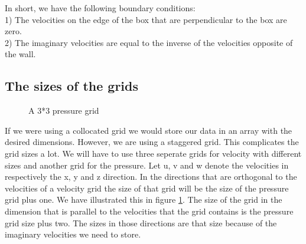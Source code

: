 \documentclass{article}
\begin{document}
In short, we have the following boundary conditions: \\
1) The velocities on the edge of the box that are perpendicular to the box are zero.\\
2) The imaginary velocities are equal to the inverse of the velocities opposite of the wall.

\newpage
\subsection{The sizes of the grids} \label{The sizes of the grids}
\begin{figure}[ht]
\centering
\caption{A 3*3 pressure grid}
\label{grid sizes}
\end{figure}

If we were using a collocated grid we would store our data in an array with the desired dimensions. However, we are using a staggered grid. This complicates the grid sizes a lot. We will have to use three seperate grids for velocity with different sizes and another grid for the pressure. Let u, v and w denote the velocities in respectively the x, y and z direction.  In the directions that are orthogonal to the velocities of a velocity grid the size of that grid will be the size of the pressure grid plus one. We have illustrated this in figure \ref{grid sizes}. The size of the grid in the dimension that is parallel to the velocities that the grid contains is the pressure grid size plus two. The sizes in those directions are that size because of the imaginary velocities we need to store.

\newpage
\end{document}
